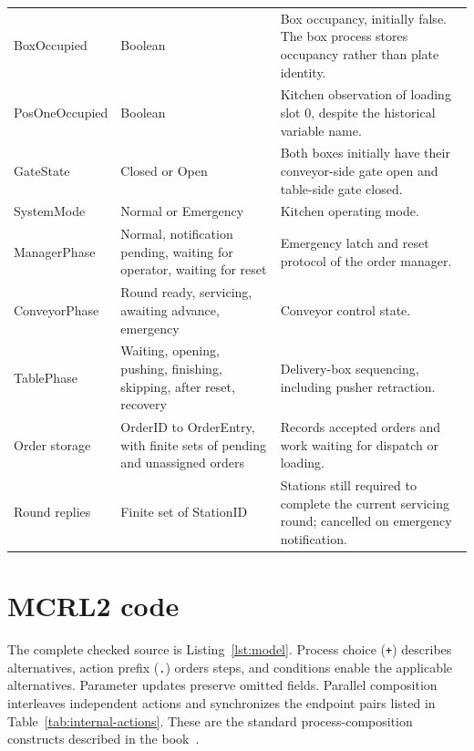 \documentclass[11pt,a4paper]{article}
\begin{document}
\begin{longtable}{@{}>{\raggedright\arraybackslash}p{}>{\raggedright\arraybackslash}p{}>{\raggedright\arraybackslash}p{}@{}}
BoxOccupied & Boolean & Box occupancy, initially false. The box process stores occupancy rather than plate identity. \\
PosOneOccupied & Boolean & Kitchen observation of loading slot 0, despite the historical variable name. \\
GateState & Closed or Open & Both boxes initially have their conveyor-side gate open and table-side gate closed. \\
SystemMode & Normal or Emergency & Kitchen operating mode. \\
ManagerPhase & Normal, notification pending, waiting for operator, waiting for reset & Emergency latch and reset protocol of the order manager. \\
ConveyorPhase & Round ready, servicing, awaiting advance, emergency & Conveyor control state. \\
TablePhase & Waiting, opening, pushing, finishing, skipping, after reset, recovery & Delivery-box sequencing, including pusher retraction. \\
Order storage & OrderID to OrderEntry, with finite sets of pending and unassigned orders & Records accepted orders and work waiting for dispatch or loading. \\
Round replies & Finite set of StationID & Stations still required to complete the current servicing round; cancelled on emergency notification. \\
\end{longtable}
\endgroup

\section{MCRL2 code}
\label{sec:code}
The complete checked source is Listing~\ref{lst:model}. Process choice (\texttt{+}) describes alternatives, action prefix (\texttt{.}) orders steps, and conditions enable the applicable alternatives. Parameter updates preserve omitted fields. Parallel composition interleaves independent actions and synchronizes the endpoint pairs listed in Table~\ref{tab:internal-actions}. These are the standard process-composition constructs described in the book~\cite[Chs.~4--5]{book}.
\end{document}

